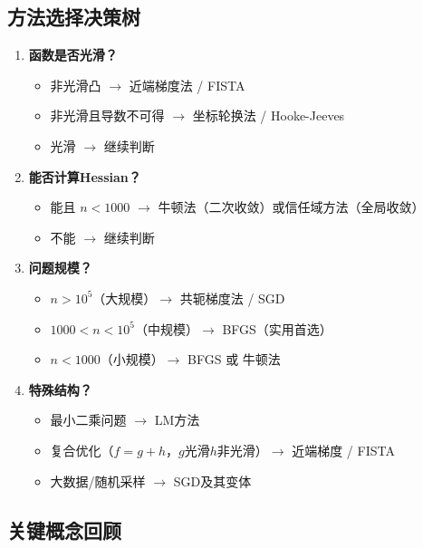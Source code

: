 \subsection{方法选择决策树}

\begin{conceptbox}[如何选择多维无约束优化方法]
\begin{enumerate}[label=\arabic*., leftmargin=2em]
    \item \textbf{函数是否光滑？}
    \begin{itemize}
        \item 非光滑凸 $\rightarrow$ 近端梯度法 / FISTA
        \item 非光滑且导数不可得 $\rightarrow$ 坐标轮换法 / Hooke-Jeeves
        \item 光滑 $\rightarrow$ 继续判断
    \end{itemize}
    \item \textbf{能否计算Hessian？}
    \begin{itemize}
        \item 能且 $n < 1000$ $\rightarrow$ 牛顿法（二次收敛）或信任域方法（全局收敛）
        \item 不能 $\rightarrow$ 继续判断
    \end{itemize}
    \item \textbf{问题规模？}
    \begin{itemize}
        \item $n > 10^5$（大规模）$\rightarrow$ 共轭梯度法 / SGD
        \item $1000 < n < 10^5$（中规模）$\rightarrow$ BFGS（实用首选）
        \item $n < 1000$（小规模）$\rightarrow$ BFGS 或 牛顿法
    \end{itemize}
    \item \textbf{特殊结构？}
    \begin{itemize}
        \item 最小二乘问题 $\rightarrow$ LM方法
        \item 复合优化（$f = g + h$，$g$光滑$h$非光滑）$\rightarrow$ 近端梯度 / FISTA
        \item 大数据/随机采样 $\rightarrow$ SGD及其变体
    \end{itemize}
\end{enumerate}
\end{conceptbox}

\subsection{关键概念回顾}

